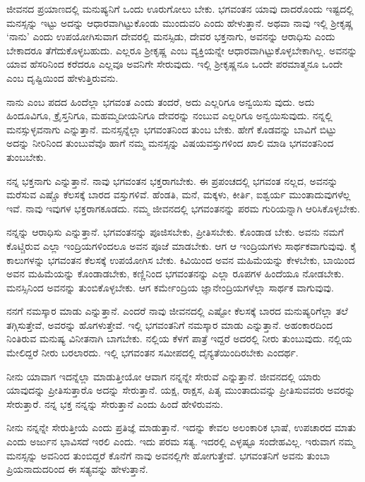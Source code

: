 ಜೀವನದ ಪ್ರಯಾಣದಲ್ಲಿ ಮನುಷ್ಯನಿಗೆ ಒಂದು ಊರುಗೋಲು ಬೇಕು. ಭಗವಂತನ ಯಾವು ದಾದರೊಂದು ಇಷ್ಟದಲ್ಲಿ ಮನಸ್ಸನ್ನು ಇಟ್ಟು ಅದನ್ನು ಆಧಾರವಾಗಿಟ್ಟುಕೊಂಡು ಮುಂದುವರಿ ಎಂದು ಹೇಳುತ್ತಾನೆ. ಅಥವಾ ನಾವು ಇಲ್ಲಿ ಶ‍್ರೀಕೃಷ್ಣ ‘ನಾನು’ ಎಂದು ಉಪಯೋಗಿಸುವಾಗ ದೇವರಲ್ಲಿ ಮನಸ್ಸಿಡು, ದೇವರ ಭಕ್ತನಾಗು, ಅವನನ್ನು ಆರಾಧಿಸು ಎಂದು ಬೇಕಾದರೂ ತೆಗೆದುಕೊಳ್ಳಬಹುದು. ಎಲ್ಲರೂ ಶ‍್ರೀಕೃಷ್ಣ ಎಂಬ ವ್ಯಕ್ತಿಯನ್ನೇ ಆಧಾರವಾಗಿಟ್ಟುಕೊಳ್ಳಬೇಕಾಗಿಲ್ಲ. ಅವನನ್ನು ಯಾವ ಹೆಸರಿನಿಂದ ಕರೆದರೂ ಎಲ್ಲವೂ ಅವನಿಗೇ ಸೇರುವುದು. ಇಲ್ಲಿ ಶ‍್ರೀಕೃಷ್ಣನೂ ಒಂದೇ ಪರಮಾತ್ಮನೂ ಒಂದೇ ಎಂಬ ದೃಷ್ಟಿಯಿಂದ ಹೇಳುತ್ತಿರುವನು.

ನಾನು ಎಂಬ ಪದದ ಹಿಂದೆಲ್ಲಾ ಭಗವಂತ ಎಂದು ತಂದರೆ, ಅದು ಎಲ್ಲರಿಗೂ ಅನ್ವಯಿಸು ವುದು. ಅದು ಹಿಂದೂವಿಗೂ, ಕ್ರೈಸ್ತನಿಗೂ, ಮಹಮ್ಮದೀಯನಿಗೂ ದೇವರನ್ನು ನಂಬುವ ಎಲ್ಲರಿಗೂ ಅನ್ವಯಿಸುವುದು. ನನ್ನಲ್ಲಿ ಮನಸ್ಸುಳ್ಳವನಾಗು ಎನ್ನುತ್ತಾನೆ. ಮನಸ್ಸನ್ನೆಲ್ಲಾ ಭಗವಂತನಿಂದ ತುಂಬ ಬೇಕು. ಹೇಗೆ ಕೊಡವನ್ನು ಬಾವಿಗೆ ಬಿಟ್ಟು ಅದನ್ನು ನೀರಿನಿಂದ ತುಂಬುವೆವೊ ಹಾಗೆ ನಮ್ಮ ಮನಸ್ಸನ್ನು ವಿಷಯವಸ್ತುಗಳಿಂದ ಖಾಲಿ ಮಾಡಿ ಭಗವಂತನಿಂದ ತುಂಬಬೇಕು.

ನನ್ನ ಭಕ್ತನಾಗು ಎನ್ನುತ್ತಾನೆ. ನಾವು ಭಗವಂತನ ಭಕ್ತರಾಗಬೇಕು. ಈ ಪ್ರಪಂಚದಲ್ಲಿ ಭಗವಂತ ನಲ್ಲದ, ಅವನನ್ನು ಮರೆಸುವ ಎಷ್ಚೊ ಕೆಲಸಕ್ಕೆ ಬಾರದ ವಸ್ತುಗಳಿವೆ. ಹೆಂಡತಿ, ಮನೆ, ಮಕ್ಕಳು, ಕೀರ್ತಿ, ಐಶ್ವರ್ಯ ಮುಂತಾದುವುಗಳೆಲ್ಲ ಇವೆ. ನಾವು ಇವುಗಳ ಭಕ್ತರಾಗಕೂಡದು. ನಮ್ಮ ಜೀವನದಲ್ಲಿ ಭಗವಂತನನ್ನು ಪರಮ ಗುರಿಯನ್ನಾಗಿ ಆರಿಸಿಕೊಳ್ಳಬೇಕು.

ನನ್ನನ್ನು ಆರಾಧಿಸು ಎನ್ನುತ್ತಾನೆ. ಭಗವಂತನನ್ನು ಪೂಜಿಸಬೇಕು, ಪ್ರೀತಿಸಬೇಕು. ಕೊಂಡಾಡ ಬೇಕು. ಅವನು ನಮಗೆ ಕೊಟ್ಚಿರುವ ಎಲ್ಲಾ ಇಂದ್ರಿಯಗಳಿಂದಲೂ ಅವನ ಪೂಜೆ ಮಾಡಬೇಕು. ಆಗ ಆ ಇಂದ್ರಿಯಗಳು ಸಾರ್ಥಕವಾಗುವುವು. ಕೈ ಕಾಲುಗಳನ್ನು ಭಗವಂತನ ಕೆಲಸಕ್ಕೆ ಉಪಯೋಗಿಸ ಬೇಕು. ಕಿವಿಯಿಂದ ಅವನ ಮಹಿಮೆಯನ್ನು ಕೇಳಬೇಕು, ಬಾಯಿಂದ ಅವನ ಮಹಿಮೆಯನ್ನು ಕೊಂಡಾಡಬೇಕು, ಕಣ್ಣಿನಿಂದ ಭಗವಂತನನ್ನು ಎಲ್ಲಾ ರೂಪಗಳ ಹಿಂದೆಯೂ ನೋಡಬೇಕು. ಮನಸ್ಸಿನಿಂದ ಅವನನ್ನು ತುಂಬಿಕೊಳ್ಳಬೇಕು. ಆಗ ಕರ್ಮೇಂದ್ರಿಯ ಜ್ಞಾನೇಂದ್ರಿಯಗಳೆಲ್ಲಾ ಸಾರ್ಥಕ ವಾಗುವುವು.

ನನಗೆ ನಮಸ್ಕಾರ ಮಾಡು ಎನ್ನುತ್ತಾನೆ. ಎಂದರೆ ನಾವು ಜೀವನದಲ್ಲಿ ಎಷ್ಟೋ ಕೆಲಸಕ್ಕೆ ಬಾರದ ಮನುಷ್ಯರಿಗೆಲ್ಲಾ ತಲೆ ತಗ್ಗಿಸುತ್ತೇವೆ, ಅವರನ್ನು ಹೊಗಳುತ್ತೇವೆ. ಇಲ್ಲಿ ಭಗವಂತನಿಗೆ ನಮಸ್ಕಾರ ಮಾಡು ಎನ್ನುತ್ತಾನೆ. ಅಹಂಕಾರದಿಂದ ನಿಂತಿರುವ ಮನುಷ್ಯ ವಿನೀತನಾಗಿ ಬಾಗಬೇಕು. ನಲ್ಲಿಯ ಕೆಳಗೆ ಪಾತ್ರೆ ಇದ್ದರೆ ಅದರಲ್ಲಿ ನೀರು ತುಂಬುವುದು. ನಲ್ಲಿಯ ಮೇಲಿದ್ದರೆ ನೀರು ಬರಲಾರದು. ಇಲ್ಲಿ ಭಗವಂತನ ಸಮೀಪದಲ್ಲಿ ದೈನ್ಯತೆಯಿಂದಿರಬೇಕು ಎಂದರ್ಥ.

ನೀನು ಯಾವಾಗ ಇದನ್ನೆಲ್ಲಾ ಮಾಡುತ್ತೀಯೋ ಆವಾಗ ನನ್ನನ್ನೇ ಸೇರುವೆ ಎನ್ನುತ್ತಾನೆ. ಜೀವನದಲ್ಲಿ ಯಾರು ಯಾವುದನ್ನು ಪ್ರೀತಿಸುತ್ತಾರೊ ಅದನ್ನು ಸೇರುತ್ತಾನೆ. ಯಕ್ಷ, ರಾಕ್ಷಸ, ಪಿತೃ ಮುಂತಾದುವನ್ನು ಪ್ರೀತಿಸುವವರು ಅವರನ್ನು ಸೇರುತ್ತಾರೆ. ನನ್ನ ಭಕ್ತ ನನ್ನನ್ನು ಸೇರುತ್ತಾನೆ ಎಂದು ಹಿಂದೆ ಹೇಳಿರುವನು.

ನೀನು ನನ್ನನ್ನೇ ಸೇರುತ್ತೀಯೆ ಎಂದು ಪ್ರತಿಜ್ಞೆ ಮಾಡುತ್ತಾನೆ. ಇದನ್ನು ಕೇವಲ ಅಲಂಕಾರಿಕ ಭಾಷೆ, ಉಪಚಾರದ ಮಾತು ಎಂದು ಅರ್ಜುನ ಭಾವಿಸದೆ ಇರಲಿ ಎಂದು. ಇದು ಪರಮ ಸತ್ಯ. ಇದರಲ್ಲಿ ಎಳ್ಳಷ್ಟೂ ಸಂದೇಹವಿಲ್ಲ. ಇರುವಾಗ ನಮ್ಮ ಮನಸ್ಸನ್ನು ಅವನಿಂದ ತುಂಬಿದ್ದರೆ ಕೊನೆಗೆ ನಾವು ಅವನಲ್ಲಿಗೇ ಹೋಗುತ್ತೇವೆ. ಭಗವಂತನಿಗೆ ಅವನು ತುಂಬಾ ಪ್ರಿಯನಾದುದರಿಂದ ಈ ಸತ್ಯವನ್ನು ಹೇಳುತ್ತಾನೆ.

